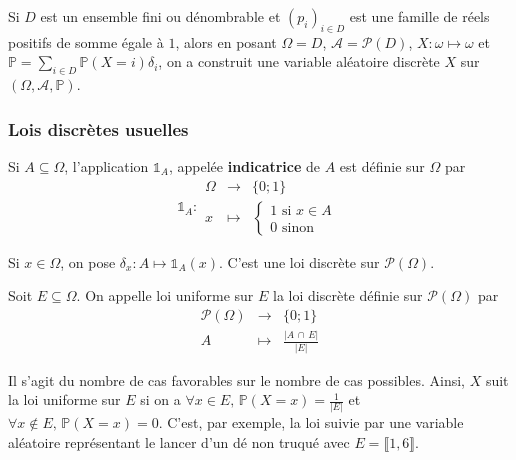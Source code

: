 	\begin{remark}
		Si $D$ est un ensemble fini ou dénombrable et $(p_i)_{i \in D}$ est une famille de réels positifs de somme égale à $1$, alors en posant $\Omega = D$, $\mathcal{A} = \mathcal{P}(D)$, $X : \omega \mapsto \omega$ et $\mathbb{P} = \sum_{i \in D} \mathbb{P}(X = i) \delta_i$, on a construit une variable aléatoire discrète $X$ sur $(\Omega, \mathcal{A}, \mathbb{P})$.
	\end{remark}

	\subsubsection{Lois discrètes usuelles}


	\begin{definition}
		Si $A \subseteq \Omega$, l'application $\mathbb{1}_A$, appelée \textbf{indicatrice} de $A$ est définie sur $\Omega$ par
		\[
			\mathbb{1}_A :
			\begin{array}{ccc}
				\Omega &\rightarrow& \{ 0; 1 \} \\
				x &\mapsto& \begin{cases}
					1 \text{ si } x \in A \\
					0 \text{ sinon}
				\end{cases}
			\end{array}
		\]
	\end{definition}

	\begin{example}
		\label{264-1}
		Si $x \in \Omega$, on pose $\delta_x : A \mapsto \mathbb{1}_A(x)$. C'est une loi discrète sur $\mathcal{P}(\Omega)$.
	\end{example}

	\begin{example}
		Soit $E \subseteq \Omega$. On appelle loi uniforme sur $E$ la loi discrète définie sur $\mathcal{P}(\Omega)$ par
		\[
		\begin{array}{ccc}
			\mathcal{P}(\Omega) &\rightarrow& \{ 0; 1 \} \\
			A &\mapsto& \frac{\vert A \, \cap \, E \vert}{\vert E \vert}
		\end{array}
		\]
	\end{example}

	\begin{remark}
		Il s'agit du nombre de cas favorables sur le nombre de cas possibles. Ainsi, $X$ suit la loi uniforme sur $E$ si on a $\forall x \in E, \, \mathbb{P}(X=x) = \frac{1}{\vert E \vert}$ et $\forall x \notin E, \, \mathbb{P}(X=x) = 0$.
		\newpar
		C'est, par exemple, la loi suivie par une variable aléatoire représentant le lancer d'un dé non truqué avec $E = \llbracket 1, 6 \rrbracket$.
	\end{remark}

